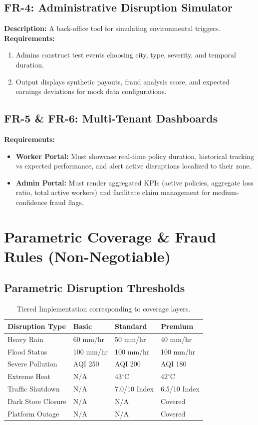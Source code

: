 \documentclass[12pt,a4paper]{article}
\begin{document}
\subsection{FR-4: Administrative Disruption Simulator}
\textbf{Description:} A back-office tool for simulating environmental triggers.\\
\textbf{Requirements:}
\begin{enumerate}
    \item Admins construct test events choosing city, type, severity, and temporal duration.
    \item Output displays synthetic payouts, fraud analysis score, and expected earnings deviations for mock data configurations.
\end{enumerate}

\subsection{FR-5 \& FR-6: Multi-Tenant Dashboards}
\textbf{Requirements:}
\begin{itemize}
    \item \textbf{Worker Portal:} Must showcase real-time policy duration, historical tracking vs expected performance, and alert active disruptions localized to their zone.
    \item \textbf{Admin Portal:} Must render aggregated KPIs (active policies, aggregate loss ratio, total active workers) and facilitate claim management for medium-confidence fraud flags.
\end{itemize}

\section{Parametric Coverage \& Fraud Rules (Non-Negotiable)}

\subsection{Parametric Disruption Thresholds}
\begin{table}[h]
\centering
\begin{tabularx}{\textwidth}{l X X X}
\toprule
\textbf{Disruption Type} & \textbf{Basic} & \textbf{Standard} & \textbf{Premium} \\
\midrule
Heavy Rain & 60 mm/hr & 50 mm/hr & 40 mm/hr \\
Flood Status & 100 mm/hr & 100 mm/hr & 100 mm/hr \\
Severe Pollution & AQI 250 & AQI 200 & AQI 180 \\
Extreme Heat & N/A & 43$^{\circ}$C & 42$^{\circ}$C \\
Traffic Shutdown & N/A & 7.0/10 Index & 6.5/10 Index \\
Dark Store Closure & N/A & N/A & Covered \\
Platform Outage & N/A & N/A & Covered \\
\bottomrule
\end{tabularx}
\caption{Tiered Implementation corresponding to coverage layers.}
\end{table}
\end{document}
